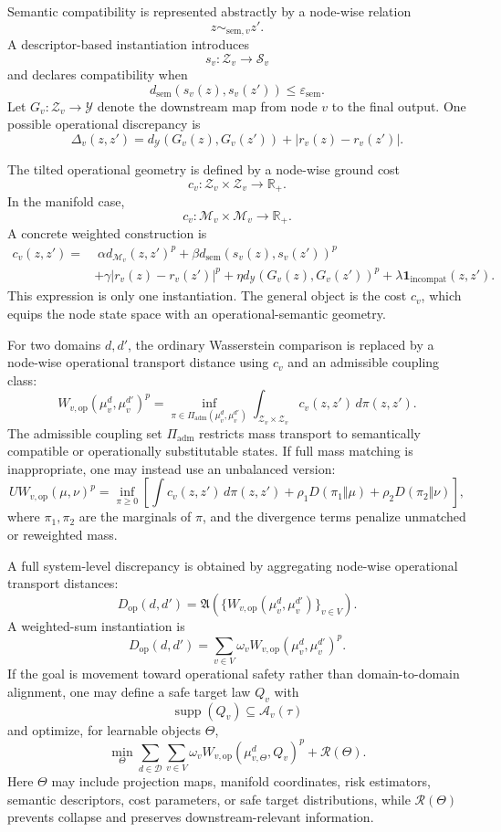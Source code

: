 \documentclass[10pt,twocolumn]{article}
\begin{document}
Semantic compatibility is represented abstractly by a node-wise relation
\[
z\sim_{\mathrm{sem},v}z'.
\]
A descriptor-based instantiation introduces
\[
s_v:\mathcal{Z}_v\rightarrow\mathcal{S}_v
\]
and declares compatibility when
\[
d_{\mathrm{sem}}(s_v(z),s_v(z'))\leq \varepsilon_{\mathrm{sem}}.
\]
Let $G_v:\mathcal{Z}_v\rightarrow\mathcal{Y}$ denote the downstream map from node $v$ to the final output. One possible operational discrepancy is
\[
\Delta_v(z,z')
=
d_{\mathcal{Y}}(G_v(z),G_v(z'))
+
|r_v(z)-r_v(z')|.
\]

The tilted operational geometry is defined by a node-wise ground cost
\[
c_v:\mathcal{Z}_v\times\mathcal{Z}_v\rightarrow\mathbb{R}_{+}.
\]
In the manifold case,
\[
c_v:\mathcal{M}_v\times\mathcal{M}_v\rightarrow\mathbb{R}_{+}.
\]
A concrete weighted construction is
\[
\begin{aligned}
c_v(z,z')
=&\;\alpha d_{\mathcal{M}_v}(z,z')^p
+\beta d_{\mathrm{sem}}(s_v(z),s_v(z'))^p\\
&+\gamma |r_v(z)-r_v(z')|^p
+\eta d_{\mathcal{Y}}(G_v(z),G_v(z'))^p
+\lambda \mathbf{1}_{\mathrm{incompat}}(z,z').
\end{aligned}
\]
This expression is only one instantiation. The general object is the cost $c_v$, which equips the node state space with an operational-semantic geometry.

For two domains $d,d'$, the ordinary Wasserstein comparison is replaced by a node-wise operational transport distance using $c_v$ and an admissible coupling class:
\[
W_{v,\mathrm{op}}(\mu_v^d,\mu_v^{d'})^p
=
\inf_{\pi\in\Pi_{\mathrm{adm}}(\mu_v^d,\mu_v^{d'})}
\int_{\mathcal{Z}_v\times\mathcal{Z}_v}c_v(z,z')\,d\pi(z,z').
\]
The admissible coupling set $\Pi_{\mathrm{adm}}$ restricts mass transport to semantically compatible or operationally substitutable states. If full mass matching is inappropriate, one may instead use an unbalanced version:
\[
UW_{v,\mathrm{op}}(\mu,\nu)^p
=
\inf_{\pi\geq 0}
\left[
\int c_v(z,z')\,d\pi(z,z')
+\rho_1D(\pi_1\Vert\mu)
+\rho_2D(\pi_2\Vert\nu)
\right],
\]
where $\pi_1,\pi_2$ are the marginals of $\pi$, and the divergence terms penalize unmatched or reweighted mass.

A full system-level discrepancy is obtained by aggregating node-wise operational transport distances:
\[
D_{\mathrm{op}}(d,d')
=
\mathfrak{A}\left(\{W_{v,\mathrm{op}}(\mu_v^d,\mu_v^{d'})\}_{v\in V}\right).
\]
A weighted-sum instantiation is
\[
D_{\mathrm{op}}(d,d')
=
\sum_{v\in V}\omega_v W_{v,\mathrm{op}}(\mu_v^d,\mu_v^{d'})^p.
\]
If the goal is movement toward operational safety rather than domain-to-domain alignment, one may define a safe target law $Q_v$ with
\[
\operatorname{supp}(Q_v)\subseteq \mathcal{A}_v(\tau)
\]
and optimize, for learnable objects $\Theta$,
\[
\min_{\Theta}
\sum_{d\in\mathcal{D}}
\sum_{v\in V}
\omega_v W_{v,\mathrm{op}}(\mu_{v,\Theta}^d,Q_v)^p
+
\mathcal{R}(\Theta).
\]
Here $\Theta$ may include projection maps, manifold coordinates, risk estimators, semantic descriptors, cost parameters, or safe target distributions, while $\mathcal{R}(\Theta)$ prevents collapse and preserves downstream-relevant information.
\end{document}
